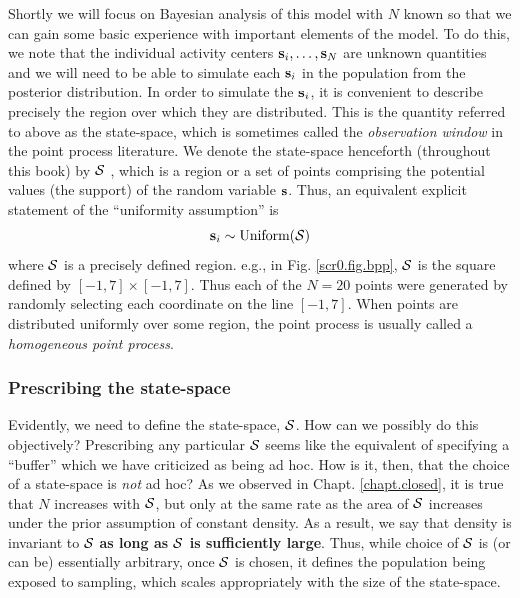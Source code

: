 Shortly we will focus on Bayesian analysis of this model with $N$
known so that we can gain some basic experience with important
elements of the model.
 To do this, we note that the individual
activity centers ${\bf s}_{i},\ldots, {\bf s}_{N}$ are unknown quantities and
we will need to be able to simulate each ${\bf s}_{i}$ in the
population from the posterior distribution.  In order to simulate
the ${\bf s}_{i}$, it is convenient to describe precisely
the region over which they are distributed. This is the
quantity referred to above as the state-space, which is sometimes called the
{\it observation window} in the point process literature. We denote
the state-space
henceforth (throughout this book) 
by
${\cal S}$ , which is a region or a set of points comprising the
potential values (the support) 
of the random variable ${\bf s}$. Thus, an equivalent explicit
statement of the ``uniformity assumption'' is
\[
{\bf s}_{i} \sim \mbox{Uniform}({\cal S})
\]
where ${\cal S}$ is a precisely defined region. e.g., in Fig.
\ref{scr0.fig.bpp}, ${\cal S}$ is the square defined by $[-1,7] \times
[-1, 7]$. Thus each of the $N=20$ points were generated by randomly
selecting each coordinate on the line $[-1, 7]$. When points are
distributed uniformly 
over some region, the point process is usually called a {\it
  homogeneous point process}.



\subsubsection{Prescribing the state-space}
\label{scr0.sec.ss}

Evidently, we need to define the state-space, ${\cal S}$. How can we
possibly do this objectively? Prescribing any particular ${\cal S}$
seems like the equivalent of specifying a ``buffer'' which we
have criticized as being ad hoc. How is it, then, that the
choice of a state-space is {\it not} ad hoc?
As we observed in Chapt. \ref{chapt.closed}, it is true
that $N$ increases with ${\cal S}$, but only at the same rate as the
area of ${\cal S}$ increases under the prior assumption of constant
density. As a result, we say that density is invariant to ${\cal S}$
{\bf as long as ${\cal S}$ is sufficiently large}. Thus, while choice of
${\cal S}$ is (or can be) essentially arbitrary, once ${\cal S}$ is
chosen, it defines the population being exposed to sampling, which
scales appropriately with the size of the state-space.

